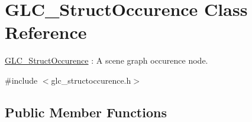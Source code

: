 \hypertarget{class_g_l_c___struct_occurence}{\section{G\-L\-C\-\_\-\-Struct\-Occurence Class Reference}
\label{class_g_l_c___struct_occurence}
}


\hyperlink{class_g_l_c___struct_occurence}{G\-L\-C\-\_\-\-Struct\-Occurence} \-: A scene graph occurence node.  




{\ttfamily \#include $<$glc\-\_\-structoccurence.\-h$>$}

\subsection*{Public Member Functions}
